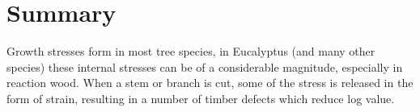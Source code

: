 \chapter{Summary}
Growth stresses form in most tree species, in Eucalyptus (and many other
species) these internal stresses can be of a considerable magnitude, especially
in reaction wood. When a stem or branch is cut, some of the stress is released
in the form of strain, resulting in a number of timber defects which reduce log
value.